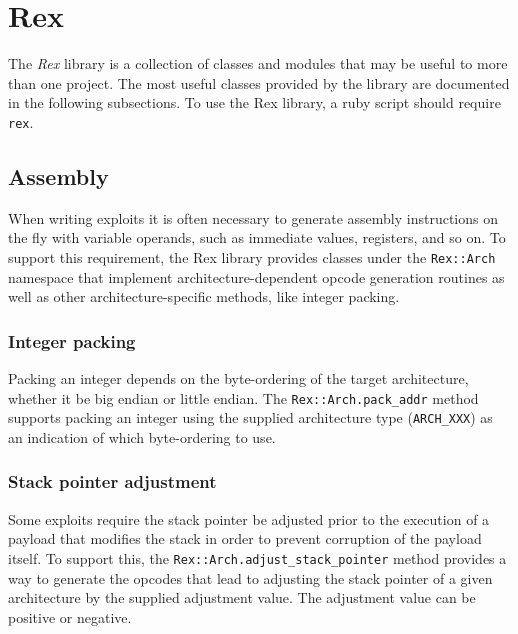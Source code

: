 \documentclass{report}
\begin{document}
\chapter{Rex}

\par
The \textit{Rex} library is a collection of classes and modules that
may be useful to more than one project.  The most useful classes
provided by the library are documented in the following subsections.
To use the Rex library, a ruby script should require \texttt{rex}.

    \section{Assembly}

\par
When writing exploits it is often necessary to generate assembly
instructions on the fly with variable operands, such as immediate
values, registers, and so on.  To support this requirement, the Rex
library provides classes under the \texttt{Rex::Arch} namespace that
implement architecture-dependent opcode generation routines as well
as other architecture-specific methods, like integer packing.

        \subsection{Integer packing}

\par
Packing an integer depends on the byte-ordering of the target
architecture, whether it be big endian or little endian.  The
\texttt{Rex::Arch.pack\_addr} method supports packing an integer
using the supplied architecture type (\texttt{ARCH\_XXX}) as an
indication of which byte-ordering to use.

        \subsection{Stack pointer adjustment}

\par
Some exploits require the stack pointer be adjusted prior to the
execution of a payload that modifies the stack in order to prevent
corruption of the payload itself.  To support this, the
\texttt{Rex::Arch.adjust\_stack\_pointer} method provides a way to
generate the opcodes that lead to adjusting the stack pointer of a
given architecture by the supplied adjustment value.  The adjustment
value can be positive or negative.
\end{document}
